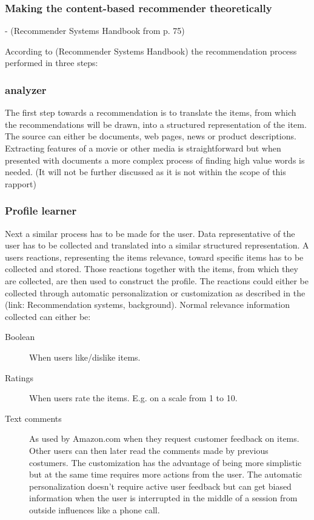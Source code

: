 \subsubsection{Making the content-based recommender theoretically}
- (Recommender Systems Handbook from p. 75)

According to (Recommender Systems Handbook) the recommendation process performed in three steps:

\subsubsection{analyzer}

The first step towards a recommendation is to translate the items, from which the recommendations will be drawn, into a structured representation of the item. The source can either be documents, web pages, news or product descriptions. Extracting features of a movie or other media is straightforward but when presented with documents a more complex process of finding high value words is needed. (It will not be further discussed as it is not within the scope of this rapport)    
 
\subsubsection{Profile learner}

Next a similar process has to be made for the user. Data representative of the user has to be collected and translated into a similar structured representation. A users reactions, representing the items relevance, toward specific items has to be collected and stored. Those reactions together with the items, from which they are collected, are then used to construct the profile. The reactions could either be collected through automatic personalization or customization as described in the (link: Recommendation systems, background). Normal relevance information collected can either be:

\begin{description}
\item[Boolean] When users like/dislike items.


\item[Ratings] When users rate the items. E.g. on a scale from 1 to 10.


\item[Text comments] As used by Amazon.com when they request customer feedback on items. Other users can then later read the comments made by previous costumers. The customization has the advantage of being more simplistic but at the same time requires more actions from the user. The automatic personalization doesn't require active user feedback but can get biased information when the user is interrupted in the middle of a session from outside influences like a phone call.
\end{description}

